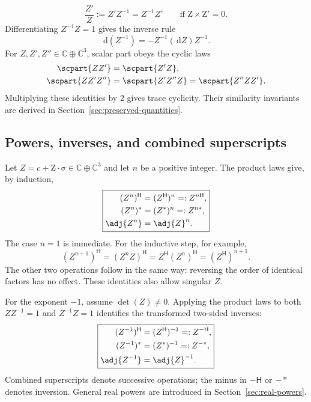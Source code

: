\documentclass[11pt]{article}
\newcommand{\pv}[1]{{#1}}
\newcommand{\vstyle}[1]{{\bm{\mathrm{#1}}}}
\newcommand{\pZ}{\pv{Z}}
\numberwithin{equation}{section}
\newcommand{\C}{\mathbb{C}}
\newcommand{\dotprod}{\cdot}
\newcommand{\bsig}{\vstyle{\sigma}}
\newcommand{\bZ}{\vstyle{Z}}
\newcommand{\dd}{\,\mathrm d}
\begin{document}
\begin{equation*}
 \frac{\pZ'}{\pZ}:=\pZ'\pZ^{-1}=\pZ^{-1}\pZ'
 \qquad\text{if }\bZ\times\bZ'=0.
\end{equation*}
Differentiating $\pZ^{-1}\pZ=1$ gives the inverse rule
\begin{equation*}
 \dd(\pZ^{-1})=-\pZ^{-1}(\dd \pZ)\pZ^{-1}.
\end{equation*}
For $\pZ,\pZ',\pZ''\in\C\oplus\C^3$, scalar part obeys the cyclic laws
\begin{align}
 \scpart{\pZ \pZ'}&=\scpart{\pZ'\pZ},
 \notag\\
 \scpart{\pZ \pZ'\pZ''}&=\scpart{\pZ'\pZ''\pZ}=\scpart{\pZ''\pZ \pZ'}.
 \label{eq:scalar-cyclic-three}
\end{align}
Multiplying these identities by $2$ gives trace cyclicity.  Their similarity
invariants are derived in Section~\ref{sec:preserved-quantities}.

\subsection{Powers, inverses, and combined superscripts}
\label{sec:powers-conjugations}

Let $\pZ=c+\bZ\dotprod\bsig\in\C\oplus\C^3$ and let $n$ be a
positive integer. The product laws give, by induction,
\begin{equation}
 \boxed{\begin{aligned}
  (\pZ^n)^{\mathsf H}&=(\pZ^{\mathsf H})^n=: \pZ^{n\mathsf H},\\
  (\pZ^n)^*&=(\pZ^*)^n=: \pZ^{n*},\\
  \adj{\pZ^n}&=\adj{\pZ}^n.
 \end{aligned}}
 \label{eq:powers-conjugations}
\end{equation}
The case $n=1$ is immediate. For the inductive step, for example,
\[
 (\pZ^{n+1})^{\mathsf H}
 =(\pZ^n\pZ)^{\mathsf H}
 =\pZ^{\mathsf H}(\pZ^n)^{\mathsf H}
 =(\pZ^{\mathsf H})^{n+1}.
\]
The other two operations follow in the same way: reversing the order
of identical factors has no effect. These identities also allow singular
$\pZ$.

For the exponent $-1$, assume $\det(\pZ)\ne0$. Applying the product
laws to both $\pZ\pZ^{-1}=1$ and $\pZ^{-1}\pZ=1$ identifies the
transformed two-sided inverses:
\begin{equation}
 \boxed{\begin{aligned}
  (\pZ^{-1})^{\mathsf H}&=(\pZ^{\mathsf H})^{-1}=: \pZ^{-\mathsf H},\\
  (\pZ^{-1})^*&=(\pZ^*)^{-1}=: \pZ^{-*},\\
  \adj{\pZ^{-1}}&=\adj{\pZ}^{-1}.
 \end{aligned}}
 \label{eq:inverses-conjugations}
\end{equation}
Combined superscripts denote successive operations; the minus in
$-\mathsf H$ or $-*$ denotes inversion. General real powers are
introduced in Section~\ref{sec:real-powers}.
\end{document}
